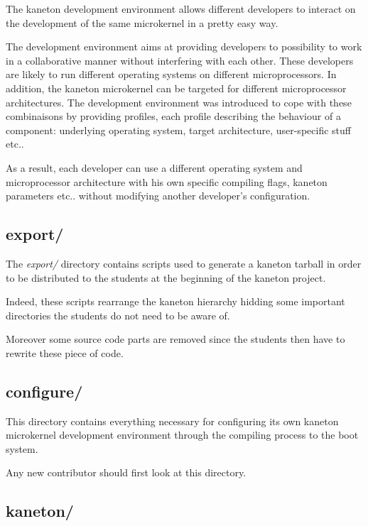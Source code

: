 The kaneton development environment allows different developers to
interact on the development of the same microkernel in a pretty easy way.

The development environment aims at providing developers to possibility to
work in a collaborative manner without interfering with each other. These
developers are likely to run different operating systems on different
microprocessors. In addition, the kaneton microkernel can be targeted for
different microprocessor architectures. The development environment was
introduced to cope with these combinaisons by providing profiles, each
profile describing the behaviour of a component: underlying operating system,
target architecture, user-specific stuff etc..

As a result, each developer can use a different operating system and
microprocessor architecture with his own specific compiling flags, kaneton
parameters etc.. without modifying another developer's configuration.

%
%

\subsection*{export/}

The \textit{export/} directory contains scripts used to generate a kaneton
tarball in order to be distributed to the students at the beginning of the
kaneton project.

Indeed, these scripts rearrange the kaneton hierarchy hidding some
important directories the students do not need to be aware of.

Moreover some source code parts are removed since the students then have to
rewrite these piece of code.

%
%

\subsection*{configure/}

This directory contains everything necessary for configuring its own
kaneton microkernel development environment through the compiling process
to the boot system.

Any new contributor should first look at this directory.

%
%

\subsection*{kaneton/}

